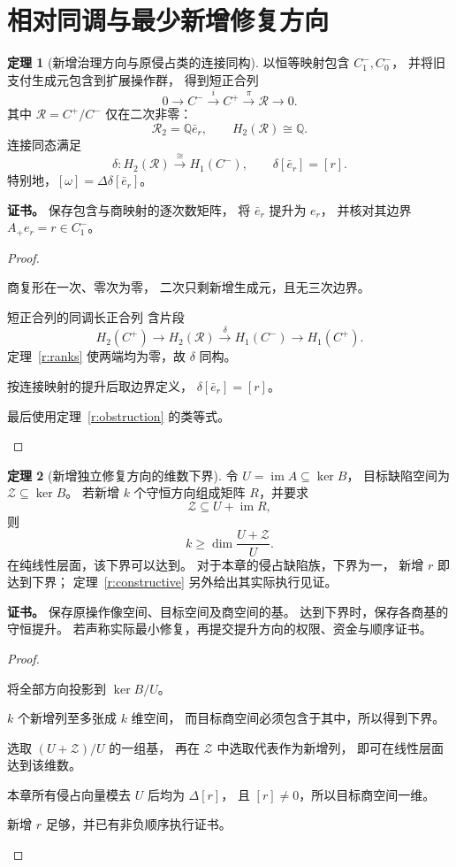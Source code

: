 \documentclass[UTF8,12pt,a4paper,openany,fontset=none,zihao=false]{ctexrep}
\theoremstyle{definition}
\newtheorem{theorem}{定理}[chapter]
\newenvironment{certificate}{\par\noindent\textbf{证书。}\ignorespaces}{\par}
\newcommand{\1}{\mathbf 1}
\begin{document}
\section{相对同调与最少新增修复方向}
\begin{theorem}[新增治理方向与原侵占类的连接同构]
\label{r:relative}
以恒等映射包含 \(C_1^-,C_0^-\)，
并将旧支付生成元包含到扩展操作群，
得到短正合列
\[
0\longrightarrow C^-\xrightarrow{i}C^+
\xrightarrow{\pi}\mathcal R\longrightarrow0.
\]
其中 \(\mathcal R=C^+/C^-\) 仅在二次非零：
\[
\mathcal R_2=\mathbb Q\bar e_r,\qquad
H_2(\mathcal R)\cong\mathbb Q.
\]
连接同态满足
\[
\boxed{
\delta:H_2(\mathcal R)\xrightarrow{\cong}H_1(C^-),
\qquad \delta[\bar e_r]=[r].
}
\]
特别地，\([\omega]=\Delta\delta[\bar e_r]\)。
\end{theorem}
\begin{certificate}
保存包含与商映射的逐次数矩阵，
将 \(\bar e_r\) 提升为 \(e_r\)，
并核对其边界 \(A_+e_r=r\in C_1^-\)。
\end{certificate}
\begin{proof}
\begin{semanticsteps}
\item 商复形在一次、零次为零，
二次只剩新增生成元，且无三次边界。
\item 短正合列的同调长正合列
\cite{Hatcher2002} 含片段
\[
H_2(C^+)\longrightarrow H_2(\mathcal R)
\xrightarrow{\delta}H_1(C^-)
\longrightarrow H_1(C^+).
\]
定理~\ref{r:ranks} 使两端均为零，故 \(\delta\) 同构。
\item 按连接映射的提升后取边界定义，
\(\delta[\bar e_r]=[r]\)。
\item 最后使用定理~\ref{r:obstruction} 的类等式。
\end{semanticsteps}
\end{proof}
\begin{theorem}[新增独立修复方向的维数下界]
\label{r:minimal-dimension}
令 \(U=\operatorname{im}A\subseteq\ker B\)，
目标缺陷空间为 \(\mathcal Z\subseteq\ker B\)。
若新增 \(k\) 个守恒方向组成矩阵 \(R\)，并要求
\[
\mathcal Z\subseteq U+\operatorname{im}R,
\]
则
\[
k\ge
\dim\frac{U+\mathcal Z}{U}.
\]
在纯线性层面，该下界可以达到。
对于本章的侵占缺陷族，下界为一，
新增 \(r\) 即达到下界；
定理~\ref{r:constructive} 另外给出其实际执行见证。
\end{theorem}
\begin{certificate}
保存原操作像空间、目标空间及商空间的基。
达到下界时，保存各商基的守恒提升。
若声称实际最小修复，再提交提升方向的权限、资金与顺序证书。
\end{certificate}
\begin{proof}
\begin{semanticsteps}
\item 将全部方向投影到 \(\ker B/U\)。
\item \(k\) 个新增列至多张成 \(k\) 维空间，
而目标商空间必须包含于其中，所以得到下界。
\item 选取 \((U+\mathcal Z)/U\) 的一组基，
再在 \(\mathcal Z\) 中选取代表作为新增列，
即可在线性层面达到该维数。
\item 本章所有侵占向量模去 \(U\) 后均为 \(\Delta[r]\)，
且 \([r]\ne0\)，所以目标商空间一维。
\item 新增 \(r\) 足够，并已有非负顺序执行证书。
\end{semanticsteps}
\end{proof}
\end{document}
